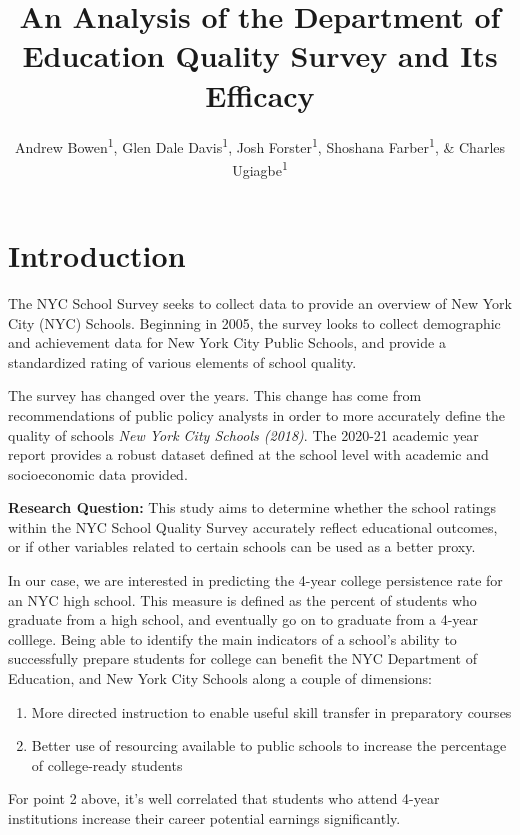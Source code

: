 \documentclass[
  man]{apa6}
\title{An Analysis of the Department of Education Quality Survey and Its Efficacy}
\author{Andrew Bowen\textsuperscript{1}, Glen Dale Davis\textsuperscript{1}, Josh Forster\textsuperscript{1}, Shoshana Farber\textsuperscript{1}, \& Charles Ugiagbe\textsuperscript{1}}
\date{}
\affiliation{\vspace{0.5cm}\textsuperscript{1} City University of New York}
\providecommand{\tightlist}{%
  \setlength{\itemsep}{0pt}\setlength{\parskip}{0pt}}
\begin{document}
\maketitle

\hypertarget{introduction}{%
\section{Introduction}\label{introduction}}

The NYC School Survey seeks to collect data to provide an overview of New York City (NYC) Schools. Beginning in 2005, the survey looks to collect demographic and achievement data for New York City Public Schools, and provide a standardized rating of various elements of school quality.

The survey has changed over the years. This change has come from recommendations of public policy analysts in order to more accurately define the quality of schools \emph{New York City Schools (2018)}. The 2020-21 academic year report provides a robust dataset defined at the school level with academic and socioeconomic data provided.

\textbf{Research Question:} This study aims to determine whether the school ratings within the NYC School Quality Survey accurately reflect educational outcomes, or if other variables related to certain schools can be used as a better proxy.

In our case, we are interested in predicting the 4-year college persistence rate for an NYC high school. This measure is defined as the percent of students who graduate from a high school, and eventually go on to graduate from a 4-year colllege. Being able to identify the main indicators of a school's ability to successfully prepare students for college can benefit the NYC Department of Education, and New York City Schools along a couple of dimensions:

\begin{enumerate}
\def\labelenumi{\arabic{enumi}.}
\tightlist
\item
  More directed instruction to enable useful skill transfer in preparatory courses
\item
  Better use of resourcing available to public schools to increase the percentage of college-ready students
\end{enumerate}

For point 2 above, it's well correlated that students who attend 4-year institutions increase their career potential earnings significantly.
\end{document}
